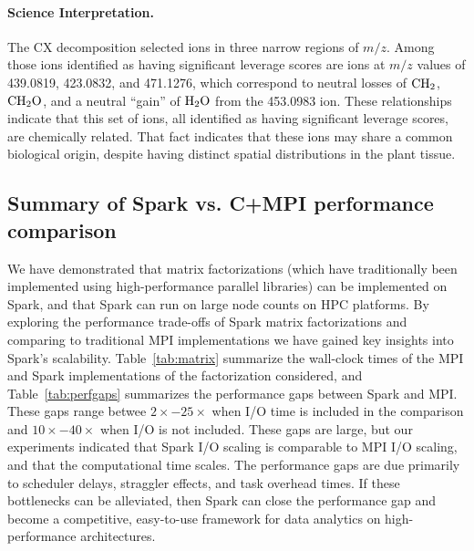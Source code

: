 \paragraph{Science Interpretation.}
 The CX decomposition selected ions in three narrow regions of $m/z$. Among those ions identified as having significant leverage scores are ions at $m/z$ values of 439.0819, 423.0832, and 471.1276, which correspond to neutral losses of $\rm{CH_2}$, $\rm{CH_2O}$, and a neutral ``gain'' of $\rm{H_2O}$ from the 453.0983 ion.  These relationships indicate that this set of ions, all identified as having significant leverage scores, are chemically related.  That fact indicates that these ions may share a common biological origin, despite having distinct spatial distributions in the plant tissue.  

\subsection{Summary of Spark vs. C+MPI performance comparison}
We have demonstrated that matrix factorizations (which have traditionally been implemented using high-performance parallel libraries) can be implemented on Spark, and that Spark can run on large node counts on HPC platforms. By exploring the performance trade-offs of Spark matrix factorizations and comparing to traditional MPI implementations we have gained key insights into Spark's scalability. Table~\ref{tab:matrix} summarize the wall-clock times of the MPI and Spark implementations of the factorization considered, and Table~\ref{tab:perfgaps} summarizes the performance gaps between Spark and MPI. These gaps range betwee $2\times - 25\times$ when I/O time is included in the comparison and $10\times - 40\times$ when I/O is not included. These gaps are large, but our experiments indicated that Spark I/O scaling is comparable to MPI I/O scaling, and that the computational time scales. The performance gaps are due primarily to scheduler delays, straggler effects, and task overhead times. If these bottlenecks can be alleviated, then Spark can close the performance gap and become a competitive, easy-to-use framework for data analytics on high-performance architectures.


